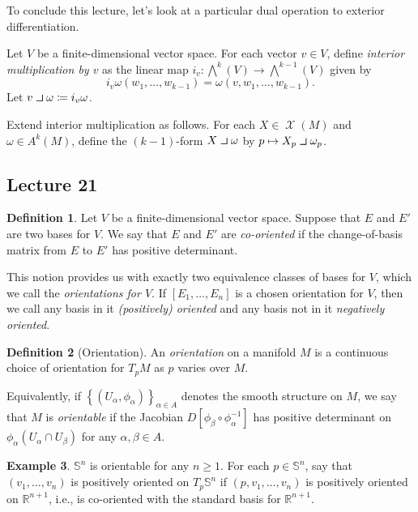 \documentclass[10pt,letterpaper,cm]{nupset}
\theoremstyle{definition}
\newtheorem{definition}{Definition}[subsection]
\newtheorem{exmp}[definition]{Example}
\theoremstyle{theorem}
\theoremstyle{remark}
\newcommand{\R}{\mathbb R}
\renewcommand{\S}{\mathbb S}
\newcommand{\1}{\mathbf{1}}
\newcommand{\0}{\vec 0}
\newcommand{\intprodl}{%
    \mathbin{\scalebox{1.5}{$\lrcorner$}}%
}
\DeclareMathOperator{\vf}{\mathscr{X}}
\begin{document}
\bigskip

To conclude this lecture, let's look at a particular dual operation to exterior differentiation.

\smallskip

Let $V$ be a finite-dimensional vector space. For each vector $v\in V$, define \textit{interior multiplication by $v$} as the linear map $i_v: \bigwedge^k(V) \to \bigwedge^{k-1}(V)$ given by $$i_v \omega(w_1, \ldots, w_{k-1})= \omega(v, w_1, \ldots, w_{k-1}).$$ Let $v \intprodl \omega \coloneqq  i_v \omega$.

\smallskip
 
 Extend interior multiplication as follows. For each $X \in \vf(M)$ and $\omega \in A^k(M)$, define the $(k-1)$-form $X \intprodl \omega$ by $p\mapsto  X_p \intprodl \omega_p$.


\subsection{Lecture 21}

\begin{definition}
Let $V$ be a finite-dimensional vector space. Suppose that $E$ and $E'$ are two bases for $V$. We say that $E$ and $E'$ are \textit{co-oriented} if the change-of-basis matrix from $E$ to $E'$   has positive determinant.
\end{definition}

This notion provides us with exactly two equivalence classes of bases for $V$, which we call the \textit{orientations for $V$}. If $\left[E_1, \ldots, E_n\right]$ is a chosen orientation for $V$, then we call any basis in it \textit{(positively) oriented} and any basis not in it \textit{negatively oriented}.

\begin{definition}[Orientation]
An \textit{orientation} on a manifold $M$ is a continuous choice of orientation for $T_pM$ as $p$ varies over $M$. 
\end{definition}

Equivalently, if $\left\{(U_{\alpha}, \phi_{\alpha})\right\}_{\alpha \in A}$ denotes the smooth structure on $M$, we say that $M$ is \textit{orientable} if the Jacobian $D\left[\phi_{\beta} \circ \phi_{\alpha}^{-1}\right]$ has positive determinant on $\phi_{\alpha}(U_{\alpha}\cap U_{\beta})$ for any $\alpha, \beta \in A$.


\begin{exmp}
$\S^n$ is orientable for any $n\geq 1$. For each $p \in \S^n$, say that $(v_1, \ldots, v_n)$ is positively oriented on $T_p\S^n$ if $\left(p, v_1, \ldots, v_n\right)$ is positively oriented on $\R^{n+1}$, i.e., is co-oriented with the standard basis for $\R^{n+1}$.
\end{exmp}
\end{document}
